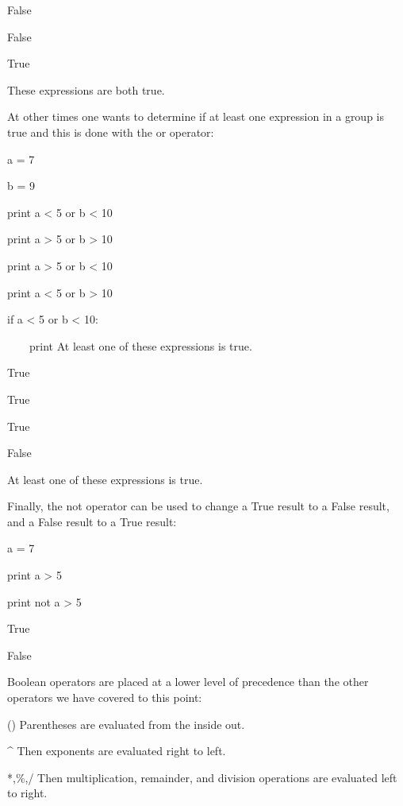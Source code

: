 \documentclass[12pt,twoside]{book}
\begin{document}
False

False

True

These expressions are both true.


\bigskip

At other times one wants to determine if at least one expression in a group is true and this is done with the or operator: 

\bigskip

a = 7

b = 9

print a {\textless} 5 or b {\textless} 10

print a {\textgreater} 5 or b {\textgreater} 10

print a {\textgreater} 5 or b {\textless} 10

print a {\textless} 5 or b {\textgreater} 10


\bigskip

if a {\textless} 5 or b {\textless} 10:

\ \ \ \ print {\textquotedbl}At least one of these expressions is
true.{\textquotedbl}

{\textbar}

True

True

True

False

At least one of these expressions is true.

Finally, the not operator can be used to change a True result to a False result, and a False result to a True result: 

\bigskip

a = 7

print a {\textgreater} 5

print not a {\textgreater} 5

{\textbar}

True

False

Boolean operators are placed at a lower level of precedence than the other operators we have covered to this point:


\bigskip

() Parentheses are evaluated from the inside out.


\bigskip

\^{} Then exponents are evaluated right to left.


\bigskip

*,\%,/ Then multiplication, remainder, and division operations are evaluated left to right. 
\end{document}
